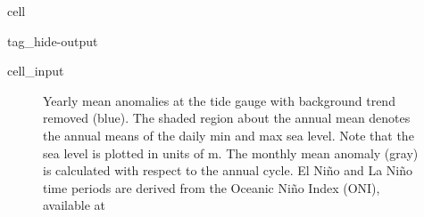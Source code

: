 \documentclass[letterpaper,10pt,english]{jupyterBook}
\begin{document}
\begin{sphinxuseclass}{cell}
\begin{sphinxuseclass}{tag_hide-output}
\begin{sphinxVerbatimInput}
\begin{sphinxuseclass}{cell_input}
\begin{sphinxVerbatim}[commandchars=\\\{\}]
    
   

  \PYG{p}{[}\PYG{p}{]}

\end{sphinxVerbatim}

\end{sphinxuseclass}\end{sphinxVerbatimInput}

\end{sphinxuseclass}
\end{sphinxuseclass}
\begin{figure}[htbp]
\centering
\capstart

\noindent{}
\caption{Yearly mean anomalies at the  tide gauge with background trend removed (blue). The shaded region about the annual mean denotes the annual means of the daily min and max sea level. Note that the sea level is plotted in units of m. The monthly mean anomaly (gray) is calculated with respect to the annual cycle. El Niño and La Niño time periods are derived from the Oceanic Niño Index (ONI), available at }\label{\detokenize{notebooks/regional_and_local/SL_anomaly_annual:sl-mma-annual-station}}\end{figure}
\end{document}
